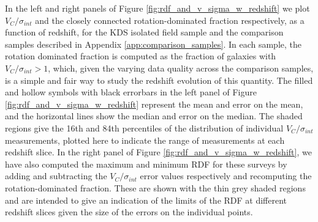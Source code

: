 \documentclass[fleqn,usenatbib]{mnras}
\begin{document}
In the left and right panels of Figure \ref{fig:rdf_and_v_sigma_w_redshift} we plot $V_{C}/\sigma_{int}$ and the closely connected rotation-dominated fraction respectively, as a function of redshift, for the KDS isolated field sample and the comparison samples described in Appendix \ref{app:comparison_samples}.
In each sample, the rotation dominated fraction is computed as the fraction of galaxies with $V_{C}/\sigma_{int} > 1$, which, given the varying data quality across the comparison samples, is a simple and fair way to study the redshift evolution of this quantity. 
The filled and hollow symbols with black errorbars in the left panel of Figure \ref{fig:rdf_and_v_sigma_w_redshift} represent the mean and error on the mean, and the horizontal lines show the median and error on the median.
The shaded regions give the 16th and 84th percentiles of the distribution of individual $V_{C}/\sigma_{int}$ measurements, plotted here to indicate the range of measurements at each redshift slice.
In the right panel of Figure \ref{fig:rdf_and_v_sigma_w_redshift}, we have also computed the maximum and minimum RDF for these surveys by adding and subtracting the $V_{C}/\sigma_{int}$ error values respectively and recomputing the rotation-dominated fraction.
These are shown with the thin grey shaded regions and are intended to give an indication of the limits of the RDF at different redshift slices given the size of the errors on the individual points.\\
\end{document}
